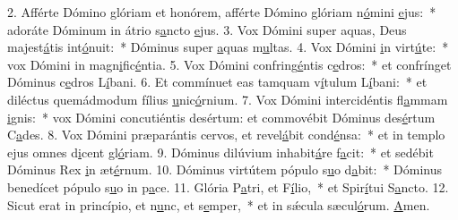 2. Afférte Dómino glóriam et honórem, afférte Dómino glóriam n\uline{ó}mini \uline{e}jus:~* adoráte Dóminum in átrio s\uline{a}ncto \uline{e}jus.
3. Vox Dómini super aquas, Deus majest\uline{á}tis int\uline{ó}nuit:~* Dóminus super \uline{a}quas m\uline{u}ltas.
4. Vox Dómini \uline{i}n virt\uline{ú}te:~* vox Dómini in magn\uline{i}fic\uline{é}ntia.
5. Vox Dómini confring\uline{é}ntis c\uline{e}dros:~* et confrínget Dóminus c\uline{e}dros L\uline{í}bani.
6. Et commínuet eas tamquam v\uline{í}tulum L\uline{í}bani:~* et diléctus quemádmodum fílius \uline{u}nic\uline{ó}rnium.
7. Vox Dómini intercidéntis fl\uline{a}mmam \uline{i}gnis:~* vox Dómini concutiéntis desértum: et commovébit Dóminus des\uline{é}rtum C\uline{a}des.
8. Vox Dómini præparántis cervos, et revel\uline{á}bit cond\uline{é}nsa:~* et in templo ejus omnes d\uline{i}cent gl\uline{ó}riam.
9. Dóminus dilúvium inhabit\uline{á}re f\uline{a}cit:~* et sedébit Dóminus Rex \uline{i}n æt\uline{é}rnum.
10. Dóminus virtútem pópulo s\uline{u}o d\uline{a}bit:~* Dóminus benedícet pópulo s\uline{u}o in p\uline{a}ce.
11. Glória P\uline{a}tri, et F\uline{í}lio,~* et Spir\uline{í}tui S\uline{a}ncto.
12. Sicut erat in princípio, et n\uline{u}nc, et s\uline{e}mper,~* et in sǽcula sæcul\uline{ó}rum. \uline{A}men.
